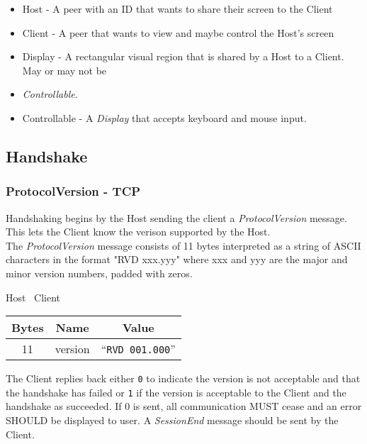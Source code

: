 \documentclass{article}
\begin{document}
    \begin{itemize}
        \item Host - A peer with an ID that wants to share their screen to the Client
        \item Client - A peer that wants to view and maybe control the Host's screen
        \item Display - A rectangular visual region that is shared by a Host to a Client. May or may not be
        \item \emph{Controllable}.
        \item Controllable - A \emph{Display} that accepts keyboard and mouse input.
    \end{itemize}

    \subsection{Handshake}

    \subsubsection{ProtocolVersion - TCP}
    Handshaking begins by the Host sending the client a \emph{ProtocolVersion} message. This lets the Client know the
    verison supported by the Host.\\

    The \emph{ProtocolVersion} message consists of 11 bytes interpreted as a string of ASCII characters in the format
    "RVD xxx.yyy" where xxx and yyy are the major and minor version numbers, padded with zeros.

    \begin{center}
        Host \textrightarrow\ Client\\
        \begin{tabular}{|c|c|c|}
            \hline
            \textbf{Bytes} & \textbf{Name} & \textbf{Value}           \\
            \hline
            11             & version       & ``\texttt{RVD 001.000}'' \\
            \hline
        \end{tabular}
    \end{center}

    The Client replies back either \texttt{0} to indicate the version is not acceptable and that the handshake has
    failed or \texttt{1} if the version is acceptable to the Client and the handshake as succeeded. If 0 is sent, all
    communication MUST cease and an error SHOULD be displayed to user. A \emph{SessionEnd} message should be sent by
    the Client. %
\end{document}
